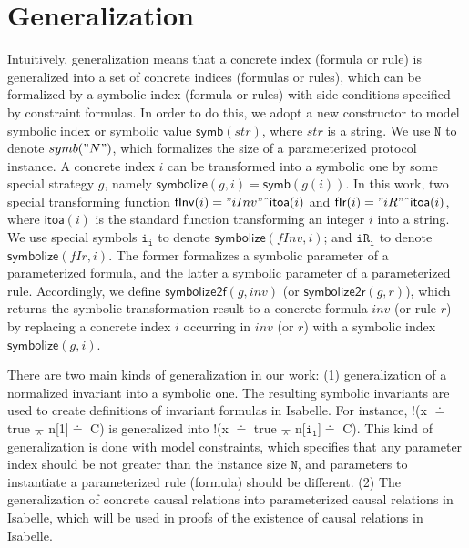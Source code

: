 \documentclass[conference]{IEEEtran}
\def \andc {\barwedge }
\def \negc {!}
\def \cat {\symbol{94}}
\def \iInv {i}
\def \iR {iR}
\newcommand\cai[1]{\textcolor{blue}{#1} }
\begin{document}
{%
\section{Generalization}\label{sec:generalization}
Intuitively, generalization means that a concrete index (formula or rule) is generalized into a set of concrete indices (formulas or rules), which can be formalized  by a symbolic index (formula or rules) with side conditions  specified by   constraint formulas.     In order to do this, we  adopt a new constructor  to model symbolic index or symbolic value $\mathsf{symb}(str)$, where $str$ is   a string.  We use $\mathtt{N}$ to denote $symb("N")$, which formalizes the size of a parameterized protocol instance. A concrete index $i$ can be transformed into a symbolic one by some special strategy $g$, namely  $\mathsf{symbolize}(g,i)=\mathsf{symb}(g(i))$. In this work, two special transforming function $\mathsf{fInv}(i)="iInv"\cat \mathsf{itoa}(i)$ and $\mathsf{fIr}(i)="iR"\cat \mathsf{itoa}(i)$, where $\mathsf{itoa}(i)$ is the standard function transforming an integer $i$ into a string. We use  special symbols $\mathtt{\iInv_i}$  to denote $\mathsf{symbolize}(fInv,i)$;  and $\mathtt{\iR_i}$ to denote $\mathsf{symbolize}(fIr,i)$. The former formalizes a symbolic parameter of a parameterized   formula, and the latter    a symbolic  parameter of a parameterized rule. Accordingly, we define $\mathsf{symbolize2f}(g,inv)$ (or  $\mathsf{symbolize2r}(g,r)$), which returns the symbolic transformation result to a concrete formula $inv$ (or rule $r$) by replacing a concrete index $i$ occurring in $inv$ (or $r$) with a symbolic index $\mathsf{symbolize}(g,i)$.


There are two
main kinds of generalization in our work: (1) generalization of a normalized invariant into a symbolic one. %
The resulting symbolic invariants are used to create definitions of invariant formulas in Isabelle. For instance,  $\negc$(x $\doteq$ true $\andc$ n[1]$\doteq$ C) is generalized into $\negc$(x $\doteq$ true $\andc$ n[$\mathtt{\iInv_1}$]$\doteq$ C).  This kind of generalization is done with model constraints, which  specifies  that any parameter index should be not greater than the instance size $\mathtt{N}$, and parameters to instantiate a parameterized rule (formula) should be different. (2) The generalization of concrete causal relations into parameterized causal relations in Isabelle, which will be used in proofs of the existence  of causal relations in Isabelle.


}
\end{document}
